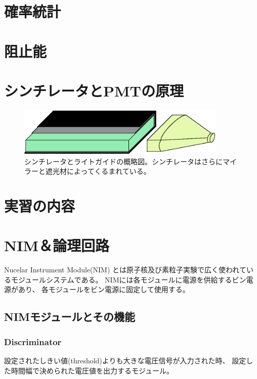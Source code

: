 \documentclass{jarticle}
\begin{document}
  \section{確率統計}
  \section{阻止能}
  \section{シンチレータとPMTの原理}

	  \begin{figure}[H]
	   \begin{center}
	    \includegraphics[width = 100mm]{./picture/Sinti.eps}
	   \end{center}
	   \caption{シンチレータとライトガイドの概略図。シンチレータはさらにマイラーと遮光材によってくるまれている。}
	   \label{Fig:Sinti}
	  \end{figure}
  

  \section{実習の内容}
  
  \clearpage 
  
  \section{NIM＆論理回路}
  Nucelar Instrument Module(NIM) とは原子核及び素粒子実験で広く使われているモジュールシステムである。
  NIMには各モジュールに電源を供給するビン電源があり、
  各モジュールをビン電源に固定して使用する。
  
  
  \subsection{NIMモジュールとその機能}

    \subsubsection*{Discriminator}
	  
	  設定されたしきい値(threshold)よりも大きな電圧信号が入力された時、
	  設定した時間幅で決められた電圧値を出力するモジュール。
 	  
\end{document}

